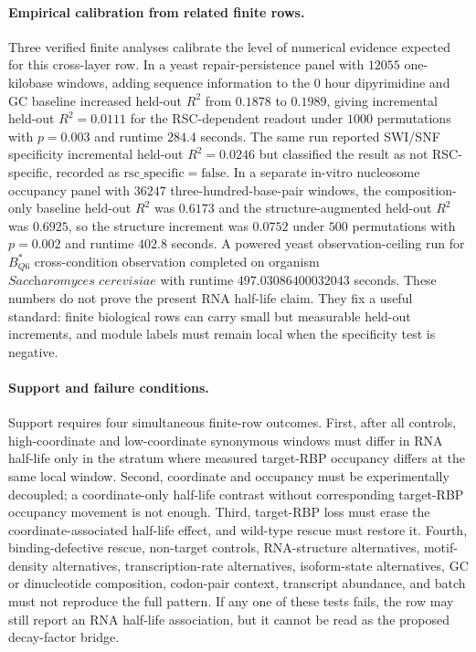 \paragraph{Empirical calibration from related finite rows.}
Three verified finite analyses calibrate the level of numerical evidence expected for this cross-layer row.  In a yeast repair-persistence panel with $12055$ one-kilobase windows, adding sequence information to the $0$ hour dipyrimidine and GC baseline increased held-out $R^{2}$ from $0.1878$ to $0.1989$, giving incremental held-out $R^{2}=0.0111$ for the RSC-dependent readout under $1000$ permutations with $p=0.003$ and runtime $284.4$ seconds.  The same run reported SWI/SNF specificity incremental held-out $R^{2}=0.0246$ but classified the result as not RSC-specific, recorded as $\mathrm{rsc\_specific}=\mathrm{false}$.  In a separate in-vitro nucleosome occupancy panel with $36247$ three-hundred-base-pair windows, the composition-only baseline held-out $R^{2}$ was $0.6173$ and the structure-augmented held-out $R^{2}$ was $0.6925$, so the structure increment was $0.0752$ under $500$ permutations with $p=0.002$ and runtime $402.8$ seconds.  A powered yeast observation-ceiling run for $B^{*}_{Q6}$ cross-condition observation completed on organism $\textit{Saccharomyces cerevisiae}$ with runtime $497.03086400032043$ seconds.  These numbers do not prove the present RNA half-life claim.  They fix a useful standard: finite biological rows can carry small but measurable held-out increments, and module labels must remain local when the specificity test is negative.

\paragraph{Support and failure conditions.}
Support requires four simultaneous finite-row outcomes.  First, after all controls, high-coordinate and low-coordinate synonymous windows must differ in RNA half-life only in the stratum where measured target-RBP occupancy differs at the same local window.  Second, coordinate and occupancy must be experimentally decoupled; a coordinate-only half-life contrast without corresponding target-RBP occupancy movement is not enough.  Third, target-RBP loss must erase the coordinate-associated half-life effect, and wild-type rescue must restore it.  Fourth, binding-defective rescue, non-target controls, RNA-structure alternatives, motif-density alternatives, transcription-rate alternatives, isoform-state alternatives, GC or dinucleotide composition, codon-pair context, transcript abundance, and batch must not reproduce the full pattern.  If any one of these tests fails, the row may still report an RNA half-life association, but it cannot be read as the proposed decay-factor bridge.


